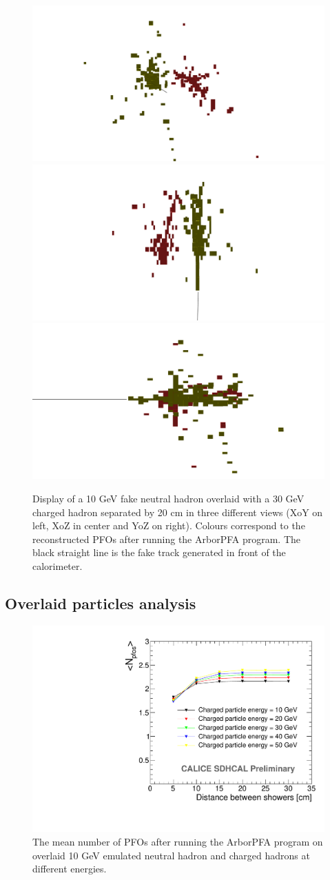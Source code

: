 \documentclass[cits]{JINST}
\begin{document}
\begin{figure}[!h]
  \begin{center}
    \includegraphics[width=0.32\linewidth]{ArborPFA_PandoraMonitoring_SDHCAL_Overlay_XY.pdf}
    \includegraphics[width=0.32\linewidth]{ArborPFA_PandoraMonitoring_SDHCAL_Overlay_XZ.pdf}
    \includegraphics[width=0.32\linewidth]{ArborPFA_PandoraMonitoring_SDHCAL_Overlay_YZ.pdf}
  \end{center}
  \caption{\label{OVERLAY_EVENT_DISPLAY} Display of a 10 GeV fake neutral hadron overlaid with a 30 GeV charged hadron separated by 20 cm in three different views (XoY on left, XoZ in center and YoZ on right). Colours correspond to the reconstructed PFOs after running the ArborPFA program. The black straight line is the fake track generated in front of the calorimeter.}
\end{figure}

\subsection{Overlaid particles analysis}

\begin{figure}[!h]
  \begin{center}
    \includegraphics[width=0.6\linewidth]{plots/OverlayEvent_NPfos.pdf}
  \end{center}
  \caption{\label{OVERLAY_EVENT_NPFOS} The mean number of PFOs after running the ArborPFA program on overlaid 10 GeV emulated neutral hadron and charged hadrons at different energies.}
\end{figure}
\end{document}
